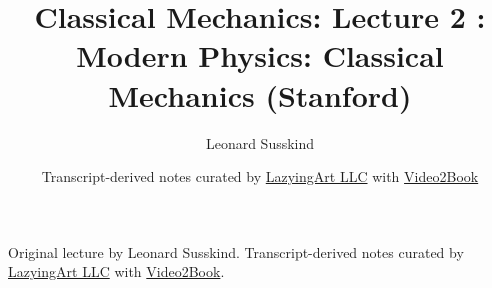 \documentclass[11pt,oneside]{book}
\begin{document}
\frontmatter
\title{Classical Mechanics: Lecture 2 : Modern Physics: Classical Mechanics (Stanford)}
\author{Leonard Susskind}
\date{Transcript-derived notes curated by \href{https://lazying.art}{LazyingArt LLC} with \href{https://github.com/lachlanchen/Video2Book}{Video2Book}}
\maketitle
\begin{center}
\small Original lecture by Leonard Susskind. Transcript-derived notes curated by \href{https://lazying.art}{LazyingArt LLC} with \href{https://github.com/lachlanchen/Video2Book}{Video2Book}.
\end{center}
\clearpage
\mainmatter

\end{document}
